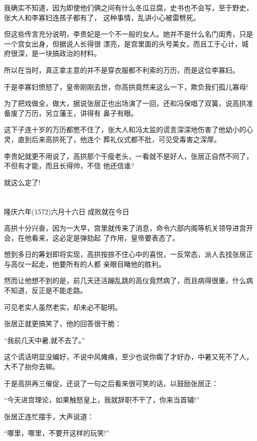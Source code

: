 \documentclass[11pt,a4paper,onecolumn]{article}
\begin{document}
我确实不知道，因为即使他们俩之间有什么冬瓜豆腐，史书也不会写，至于野史，张大人和李寡妇连孩子都有了，
这种事情，乱讲小心被雷劈死。

但这些传言充分说明，李贵妃是一个不一般的女人。她并不是什么名门闺秀，只是一个宫女出身，但据说人长得很
漂亮，是宫里面的头号美女，而且工于心计，城府很深，是一块搞政治的材料。

所以在当时，真正拿主意的并不是穿衣服都不利索的万历，而是这位李寡妇。

于是李寡妇愤怒了，皇帝刚刚去世，你高拱竟然来这么一下，欺负我们孤儿寡母!

为了把戏做全，做大，据说张居正也出场演了一回，还和冯保唱了双簧，说高拱准备废了万历，另立藩王，讲得有
鼻子有眼。

这下子连十岁的万历都憋不住了，张大人和冯太监的谎言深深地伤害了他幼小的心灵，直到后来高拱死了，他连个
葬礼仪式都不批，可见受毒害之深厚。

李贵妃就更不用说了，高拱那个干瘦老头，一看就不是好人，张居正自然不同了，不但有才能，而且长得帅，不信
他还信谁?

就这么定了!

\section[\thesection]{}

隆庆六年(1572)六月十六日 成败就在今日

高拱十分兴奋，因为一大早，宫里就传来了消息，命令六部内阁等机关领导进宫开会，在他看来，这必定是弹劾起
了作用，皇帝要表态了。

想到多日的筹划即将实现，高拱按捺不住心中的喜悦，一反常态，派人去找张居正与高仪一起走，他要所有的人都
亲眼目睹他的胜利。

然而让他想不到的是，前几天还活蹦乱跳的高仪竟然病了，而且病得很重，什么病不知道，反正是不能走路。

可见老实人虽然老实，却未必不聪明。

张居正就更搞笑了，他的回答很干脆：

``我前几天中暑,就不去了。''

这个谎话明显没编好，不说中风瘫痪，至少也说你瘸了才好办，中暑又死不了人，大不了抬你去嘛。

于是高拱再三催促，还说了一句之后看来很可笑的话，以鼓励张居正：

``今天进宫理论，如果触怒皇上，我就辞职不干了，你来当首辅!''

张居正连忙摆手，大声说道：

``哪里，哪里，不要开这样的玩笑!''
\end{document}
